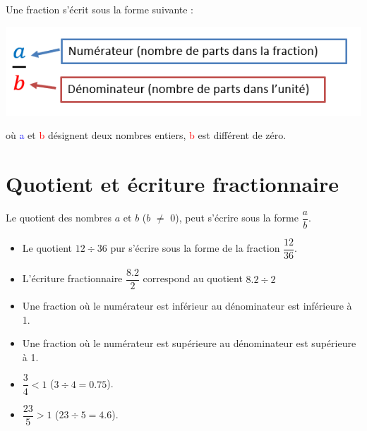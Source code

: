 \documentclass[12pt,a4paper]{article}
\begin{document}
\begin{mydef}
	Une fraction s'écrit sous la forme suivante :
	
	\begin{center}
		\includegraphics[scale=0.7]{definition}
	\end{center}
	
	où \textcolor{blue}{a} et \textcolor{red}{b} désignent deux nombres entiers, \textcolor{red}{b} est différent de zéro.
\end{mydef}

\section{Quotient et écriture fractionnaire}

	\begin{mydef}
		Le quotient des nombres $a$ et $b$ ($b$ $\neq$ 0), peut s'écrire sous la forme $\dfrac{a}{b}$.
	\end{mydef}

	\begin{myexs}
		\begin{itemize}
			\item  Le quotient $12 \div 36$ pur s'écrire sous la forme de la fraction $\dfrac{12}{36}$.
			
			\item L'écriture fractionnaire $\dfrac{\num{8,2}}{2}$ correspond au quotient $\num{8,2} \div 2$
		\end{itemize}
	\end{myexs}

	\begin{myprops}
		
		\begin{itemize}
			\item Une fraction où le numérateur est inférieur au dénominateur est inférieure à 1. 
			\item Une fraction où le numérateur est supérieure au dénominateur est supérieure à 1.
		\end{itemize}
	\end{myprops}

	\begin{myexs}
		\begin{itemize}
			\item  $\dfrac{3}{4} < 1$ ($3 \div 4 = \num{0.75}$).
			
			\item $\dfrac{23}{5} > 1$ ($23 \div 5 = \num{4.6}$).
		\end{itemize}
	\end{myexs}
\end{document}
